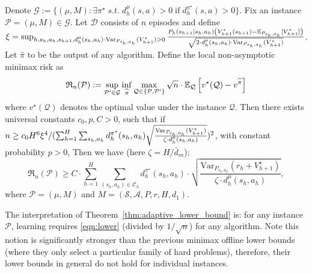 \begin{theorem}\label{thm:adaptive_lower_bound}
	Denote $\mathcal{G}:=\{(\mu,M): \exists \pi^\star\;s.t. \; d^\mu_h(s,a)>0\;\text{if}\;d^{\pi^\star}_h(s,a)>0\}$. Fix an instance $\mathcal{P}=(\mu,M)\in\mathcal{G}$. Let $\mathcal{D}$ consists of $n$ episodes and define $\xi=\sup_{h,s_h,a_h,s_{h+1}, d^\mu_h(s_h,a_h)\cdot \mathrm{Var}_{P_{s_h,a_h}}(V_{h+1}^\star)>0}\frac{P_h(s_{h+1}|s_h,a_h)\left(V_{h+1}^\star(s_{h+1})-\mathbb{E}_{P_{s_h,a_h}}[V_{h+1}^\star]\right)}{\sqrt{2\cdot  d^\mu_h(s_h,a_h)\cdot \mathrm{Var}_{P_{s_h,a_h}}(V_{h+1}^\star)}}$. Let $\widehat{\pi}$ to be the output of any algorithm.  Define the {local non-asymptotic minimax risk} as 
	\begin{equation}\label{eqn:local_risk}
	\mathfrak{R}_{n}(\mathcal{P}):=\sup_{\mathcal{P}'\in\mathcal{G}}\inf_{\widehat{\pi}}\max_{\mathcal{Q}\in\{\mathcal{P},\mathcal{P}'\}}\sqrt{n}\cdot\mathbb{E}_{\mathcal{Q}}\left[v^\star(\mathcal{Q})-v^{\widehat{\pi}}\right]
	\end{equation}
	where $v^\star(\mathcal{Q})$ denotes the optimal value under the instance $\mathcal{Q}$. Then there exists universal constants $c_0,p,C>0$, such that if $n\geq c_0{H^6\xi^4}/{(\sum_{h=1}^H \sum_{s_h,a_h}d^{\pi^\star}_h(s_h,a_h)\sqrt{\frac{\mathrm{Var}_{P_{s_h,a_h}}(V_{h+1}^\star)}{ \zeta \cdot d^\mu_h(s_h,a_h)}})^2}$, with constant probability $p>0$, 
	Then we have (here $\zeta =H/\bar{d}_m$):
	\begin{equation}\label{eqn:lower}
	\mathfrak{R}_{n}(\mathcal{P})\geq C\cdot {\sum_{h=1}^H\sum_{(s_h,a_h)\in\mathcal{C}_h}d^{\pi^\star}_h(s_h,a_h)\cdot\sqrt{\frac{\mathrm{Var}_{P_{s_h,a_h}}(r_h+V^\star_{h+1})}{\zeta \cdot d^\mu_h{(s_h,a_h)}}}},
	\end{equation}
	where $\mathcal{P}=(\mu,M)$ and $M=(\mathcal{S}, \mathcal{A}, P, r, H, d_1)$.
\end{theorem}

The interpretation of Theorem~\ref{thm:adaptive_lower_bound} is: for any instance $\mathcal{P}$, learning requires \eqref{eqn:lower} (divided by $1/\sqrt{n}$) for any algorithm. Note this notion is significantly stronger than the previous minimax offline lower bounds \citep{yin2021near,rashidinejad2021bridging,xie2021policy,jin2020pessimism} (where they only select a particular family of hard problems), therefore, their lower bounds in general do not hold for individual instances. 

